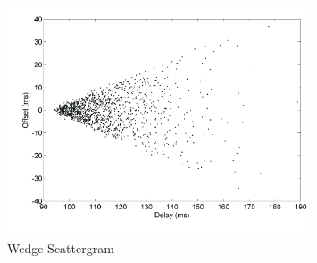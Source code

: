 
\begin{figure}[htb]
    \centering
    \includegraphics[width=0.8\textwidth]{figures/clock_filter.png}
    \caption{Wedge Scattergram}
    \label{fig:clock_filter}
\end{figure}

